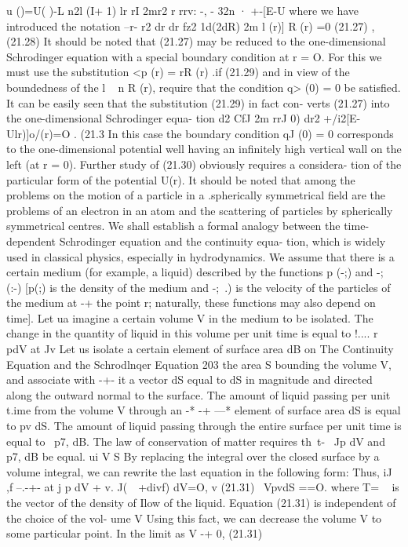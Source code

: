 \documentclass[a4paper,sfsidenotes,colorlinks=true]{tufte-book}
\numberwithin{equation}{section}
\numberwithin{figure}{section}
\begin{document}
{{{u ()=U( )-L n2l (I+ 1) lr rI 2mr2 
r rrv: -, -	32n	·
+-[E-U where we have introduced the notation
--r- r2 dr	dr	fz2
1d(2dR) 2m
l (r)] R (r) =0	(21.27) ,
(21.28)
It should be noted that (21.27) may be reduced to the one-dimensional Schrodinger equation with a special boundary condition at r = O. For this we must use the substitution
<p (r) = rR (r)	.if	(21.29)
and	in	view	of	the	boundedness	of	the	l ~ n	R	(r), require that the condition q> (0) = 0 be satisfied. It can be easily seen that the substitution (21.29) in fact con- verts (21.27) into the one-dimensional Schrodinger equa- tion
d2 CfJ	2m	rrJ	0) dr2	+/i2[E-Ul{r)]o/(r)=O .	(21.3
In this case the boundary condition qJ (0) = 0 corresponds to the one-dimensional potential well having an infinitely high vertical wall on the left (at r = 0).
Further study of (21.30) obviously requires a considera- tion of the particular form of the potential U(r). It should be noted that among the problems on the motion of a particle in a .spherically symmetrical field are the problems of an electron in an atom and the scattering of particles by spherically symmetrical centres.
We shall establish a formal analogy between the time- dependent Schrodinger equation and the continuity equa- tion, which is widely used in classical physics, especially in hydrodynamics. We assume that there is a certain medium (for example, a liquid) described by the functions
p (-;) and -; (:-) [p(;) is the density of the medium and
-;~.) is the velocity of the particles of the medium at -+
the point r; naturally, these functions may also depend on time]. Let ua imagine a certain volume V in the medium to be isolated. The change in the quantity of
liquid in this volume per unit time is equal to !.... r pdV at Jv
Let us isolate a certain element of surface area dB on
The Continuity Equation and the Schrodlnqer Equation
203
the area S bounding the volume V, and associate with -+-
it a vector dS equal to dS in magnitude and directed along
the outward normal to the surface. The amount of liquid
passing per unit t.ime from the volume V through an -*	-+ ---*
element of surface area dS is equal to pv dS. The amount of liquid passing through the entire surface per unit
time is equal to ~p7, dB. The law of conservation of matter requires th~t- ~Jp dV and ~ p7, dB be equal.
ui V	S
By replacing the integral over the closed surface by a volume integral, we can rewrite the last equation in the following form:
Thus,
iJ	,f --.-+-
at j p dV + v.
J(~~+divf) dV=O, v
(21.31)
~VpvdS ==O.
where T= ~ is the vector of the density of Ilow of the liquid. Equation (21.31) is independent of the choice of the vol- ume V Using this fact, we can decrease the volume V to some particular point. In the limit as V -+ 0, (21.31)
}}}}
\end{document}
